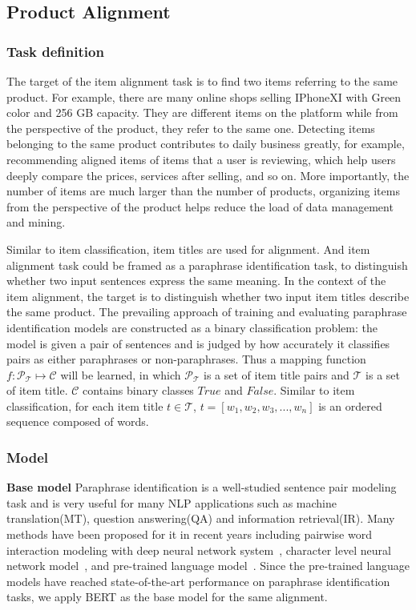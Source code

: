 \subsection{Product Alignment}

\subsubsection{Task definition}
The target of the item alignment task is to find two items referring to the same product. For example, there are many online shops selling IPhoneXI with Green color and 256 GB capacity. They are different items on the platform while from the perspective of the product, they refer to the same one. Detecting items belonging to the same product contributes to daily business greatly, for example, recommending aligned items of items that a user is reviewing, which  help users deeply compare the prices, services after selling, and so on. More importantly, the number of items are much larger than the number of products, organizing items from the perspective of the product helps reduce the load of data management and mining.

Similar to item classification, item titles are used for alignment. And item alignment task could be framed as a paraphrase identification task, to distinguish whether two input sentences express the same meaning\cite{PI}. In the context of the item alignment, the target is to distinguish whether two input item titles describe the same product. The prevailing approach of training and evaluating paraphrase identification models are constructed as a binary classification problem: the model is given a pair of sentences and is judged by how accurately it classifies pairs as either paraphrases or non-paraphrases. Thus a mapping function $f: \mathcal{P_T} \mapsto \mathcal{C}$ will be learned, in which $\mathcal{P_T}$ is a set of item title pairs and   $\mathcal{T}$ is a set of item title. $\mathcal{C}$ contains binary classes $True$ and $False$. Similar to item classification, for each item title $t\in \mathcal{T}$, $t = [ w_1, w_2, w_3, ..., w_n ]$ is an ordered sequence composed of words.


\subsubsection{Model}

\textbf{Base model}
Paraphrase identification is a well-studied sentence pair modeling task and is very useful for many NLP applications such as machine translation(MT)\cite{vaswani2018tensor2tensor}, question answering(QA)\cite{yih2015semantic} and information retrieval(IR)\cite{berger2017information}. Many methods have been proposed for it in recent years including pairwise word interaction modeling with deep neural network system~\cite{DBLP:conf/naacl/HeL16}, character level neural network model~\cite{DBLP:conf/naacl/LanX18}, and pre-trained language model~\cite{BERT}. Since the pre-trained language models have reached state-of-the-art performance on paraphrase identification tasks, we apply BERT as the base model for the same alignment. 

